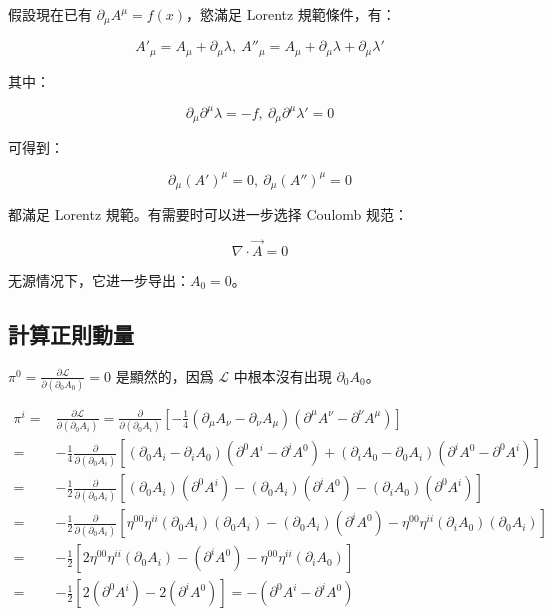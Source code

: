 \documentclass{article}
\begin{document}
假設現在已有 $\partial_{\mu}A^{\mu}=f(x)$，慾滿足 Lorentz 規範條件，有：

$$
  A'_{\mu}=A_{\mu}+\partial_{\mu}\lambda,\ A''_{\mu}=A_{\mu}+\partial_{\mu}\lambda+\partial_{\mu}\lambda'
$$

其中：

$$
  \partial_{\mu}\partial^{\mu}\lambda=-f,\ \partial_{\mu}\partial^{\mu}\lambda'=0
$$

可得到：

$$
  \partial_{\mu}(A')^{\mu}=0,\ \partial_{\mu}(A'')^{\mu}=0
$$

都滿足 Lorentz 規範。有需要时可以进一步选择 Coulomb 规范：

$$
  \nabla\cdot\vec{A}=0
$$

无源情况下，它进一步导出：$A_0=0$。

\subsection{計算正則動量}

$\pi^0=\frac{\partial\mathcal{L}}{\partial(\partial_0A_0)}=0$ 是顯然的，因爲 $\mathcal{L}$ 中根本沒有出現 $\partial_0A_0$。

$$
  \begin{aligned}
    \pi^i= & \frac{\partial\mathcal{L}}{\partial(\partial_0A_i)}=\frac{\partial}{\partial(\partial_0A_i)}\left[-\frac{1}{4}(\partial_{\mu}A_{\nu}-\partial_{\nu}A_{\mu})(\partial^{\mu}A^{\nu}-\partial^{\nu}A^{\mu})\right] \\
    =      & -\frac{1}{4}\frac{\partial}{\partial(\partial_0A_i)}\left[(\partial_0A_i-\partial_iA_0)(\partial^0A^i-\partial^iA^0)+(\partial_iA_0-\partial_0A_i)(\partial^iA^0-\partial^0A^i)\right]                          \\
    =      & -\frac{1}{2}\frac{\partial}{\partial(\partial_0A_i)}\left[(\partial_0A_i)(\partial^0A^i)-(\partial_0A_i)(\partial^iA^0)-(\partial_iA_0)(\partial^0A^i)\right]                                                   \\
    =      & -\frac{1}{2}\frac{\partial}{\partial(\partial_0A_i)}\left[\eta^{00}\eta^{ii}(\partial_0A_i)(\partial_0A_i)-(\partial_0A_i)(\partial^iA^0)-\eta^{00}\eta^{ii}(\partial_iA_0)(\partial_0A_i)\right]               \\
    =      & -\frac{1}{2}\left[2\eta^{00}\eta^{ii}(\partial_0A_i)-(\partial^iA^0)-\eta^{00}\eta^{ii}(\partial_iA_0)\right]                                                                                                   \\
    =      & -\frac{1}{2}\left[2(\partial^0A^i)-2(\partial^iA^0)\right]=-(\partial^0A^i-\partial^iA^0)
  \end{aligned}
$$
\end{document}
